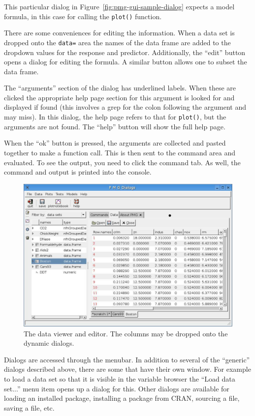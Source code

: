 \documentclass[12pt]{article}
\newcommand{\RFunc}[1]{\texttt{#1()}}
\begin{document}
\begin{description}
 

  
  This particular dialog in Figure~\ref{fig:pmg-gui-sample-dialog}
  expects a model formula, in this case for calling the \RFunc{plot}
  function.

  There are some conveniences for editing the information. When a data
  set is dropped onto the \verb+data=+ area the names of the data
  frame are added to the dropdown values for the response and
  predictor. Additionally, the ``edit'' button opens a dialog for
  editing the formula. A similar button allows one to subset the data
  frame.

  The ``arguments'' section of the dialog has underlined labels. When
  these are clicked the appropriate help page section for this
  argument is looked for and displayed if found (this involves a grep
  for the colon following the argument and may miss). In this dialog, the
  help page refers to that for \verb+plot()+, but the arguments are
  not found. The ``help'' button will show the full help page.

  When  the ``ok'' button is pressed, the arguments are collected and
  pasted together to make a function call. This is then sent to the
  command area and evaluated. To see the output, you need to click the
  command tab. As well, the command and output is printed into the
  console. 
\end{description}

\begin{figure}[htbp]
  \centering
  \includegraphics[width=.8\textwidth]{pmg-dataviewer}
  \caption{The data viewer and editor. The columns may be dropped onto
  the dynamic dialogs.}
  \label{fig:pmg-gui-pmg-dataviewer}
\end{figure}


Dialogs are accessed through the menubar. In addition to several of
the ``generic'' dialogs described above, there are some that have
their own window. For example to load a data set so that it is visible
in the variable browser the ``Load data set...''  menu item opens up a
dialog for this. Other dialogs are available for loading an installed
package, installing a package from CRAN, sourcing a file, saving a
file, etc.
\end{document}
